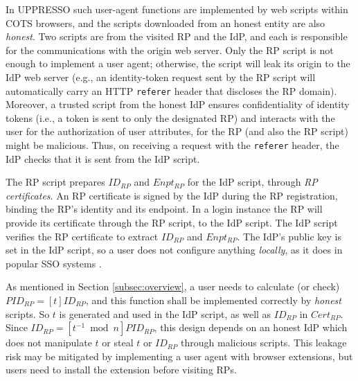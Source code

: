 In UPPRESSO such user-agent functions are implemented by web scripts within COTS browsers,
and the scripts downloaded from an honest entity are also \emph{honest}.
Two scripts are from the visited RP and the IdP, %
    and each is responsible for the communications with the origin web server.
Only the RP script is not enough to implement a user agent;
    otherwise, the script will leak its origin to the IdP web server
    (e.g.,
    an identity-token request sent by the RP script will
automatically carry an HTTP \verb+referer+ header that discloses the RP domain).
Moreover, a trusted script from the honest IdP
ensures confidentiality of identity tokens (i.e., a token is sent to only the designated RP)
and interacts with the user for the authorization of user attributes,
    for the RP (and also the RP script) might be malicious.
Thus, on receiving a request with the \verb+referer+ header,
    the IdP checks that it is sent from the IdP script.

The RP script prepares $ID_{RP}$ and $Enpt_{RP}$ for the IdP script, through \emph{RP certificates}.
An RP certificate is signed by the IdP during the RP registration,
     binding the RP's identity and its endpoint. %
In a login instance
    the RP will provide its certificate through the RP script, to the IdP script.
The IdP script %
    verifies the RP certificate to extract $ID_{RP}$ and $Enpt_{RP}$.
The IdP's public key is set in the IdP script, so
 a user does not configure anything \emph{locally},
    as it does in popular SSO systems \cite{OpenIDConnect, rfc6749, SAML,SAMLIdentifier}.


As mentioned in Section \ref{subsec:overview},
    a user needs to calculate (or check) $PID_{RP} = [t]ID_{RP}$,
    and this function shall be implemented correctly by \emph{honest} scripts.
So $t$ is generated and used in the IdP script,
    as well as $ID_{RP}$ in $Cert_{RP}$.
Since $ID_{RP} = [t^{-1}\bmod n]PID_{RP}$,
    this design depends on an honest IdP which does not manipulate $t$ or steal $t$ or $ID_{RP}$ through malicious scripts.
This leakage risk may be mitigated %
    by implementing a user agent with browser extensions,
but users need to install the extension before visiting RPs.

